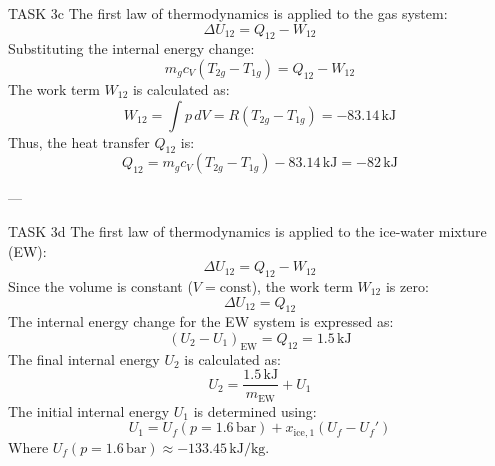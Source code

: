 TASK 3c  
The first law of thermodynamics is applied to the gas system:  
\[
\Delta U_{12} = Q_{12} - W_{12}
\]  
Substituting the internal energy change:  
\[
m_g c_V (T_{2g} - T_{1g}) = Q_{12} - W_{12}
\]  
The work term \( W_{12} \) is calculated as:  
\[
W_{12} = \int p \, dV = R(T_{2g} - T_{1g}) = -83.14 \, \text{kJ}
\]  
Thus, the heat transfer \( Q_{12} \) is:  
\[
Q_{12} = m_g c_V (T_{2g} - T_{1g}) - 83.14 \, \text{kJ} = -82 \, \text{kJ}
\]  

---

TASK 3d  
The first law of thermodynamics is applied to the ice-water mixture (EW):  
\[
\Delta U_{12} = Q_{12} - W_{12}
\]  
Since the volume is constant (\( V = \text{const} \)), the work term \( W_{12} \) is zero:  
\[
\Delta U_{12} = Q_{12}
\]  
The internal energy change for the EW system is expressed as:  
\[
(U_2 - U_1)_{\text{EW}} = Q_{12} = 1.5 \, \text{kJ}
\]  
The final internal energy \( U_2 \) is calculated as:  
\[
U_2 = \frac{1.5 \, \text{kJ}}{m_{\text{EW}}} + U_1
\]  
The initial internal energy \( U_1 \) is determined using:  
\[
U_1 = U_f(p = 1.6 \, \text{bar}) + x_{\text{ice},1}(U_f - U_f')
\]  
Where \( U_f(p = 1.6 \, \text{bar}) \approx -133.45 \, \text{kJ/kg} \).  
